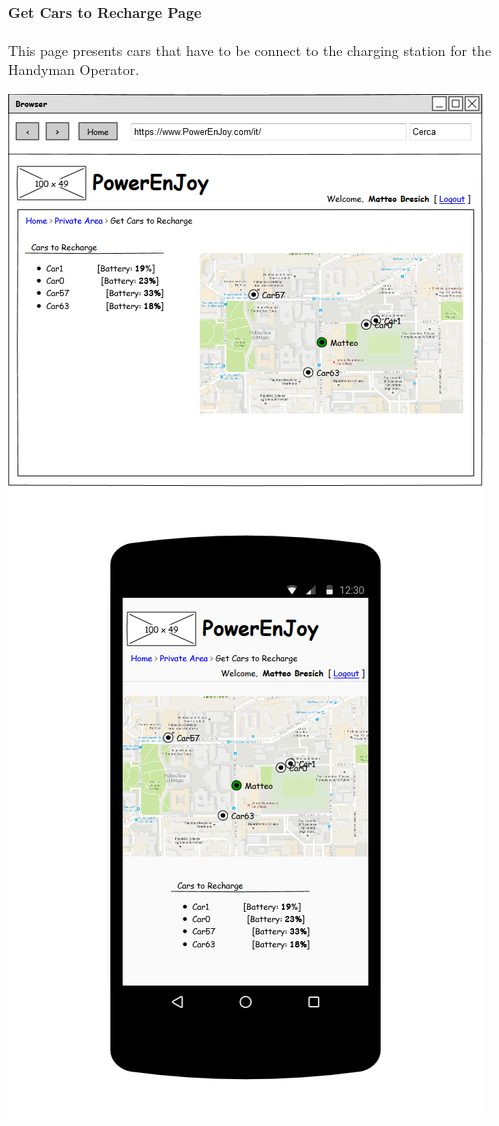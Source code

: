 \documentclass{article}
\begin{document}
			\paragraph{Get Cars to Recharge Page} This page presents cars that have to be connect to the charging station for the Handyman Operator.
			\begin{center}
				\includegraphics[width=0.6\linewidth]{"img/ui/get-cars-recharge"}
			\end{center}
			\pagebreak
			
\end{document}
